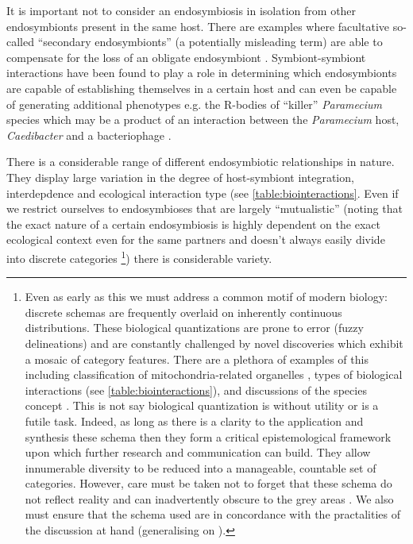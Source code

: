 It is important not to consider an endosymbiosis in isolation from other endosymbionts present in the same host.
There are examples where facultative so-called ``secondary endosymbionts'' (a potentially misleading term) 
are able to compensate for the loss of an obligate endosymbiont \citep{Koga2003}.  Symbiont-symbiont 
interactions have been found to play a role in determining which endosymbionts are capable of establishing themselves 
in a certain host and can even be capable of generating additional phenotypes e.g. the R-bodies of ``killer'' \textit{Paramecium} 
species which may be a product of an interaction between the \textit{Paramecium} host, \textit{Caedibacter} and a bacteriophage
\citep{Schrallhammer2009}.

There is a considerable range of different endosymbiotic relationships in nature. They display large variation in the 
degree of host-symbiont integration, interdepdence and ecological interaction type (see \ref{table:biointeractions}.  
Even if we restrict ourselves to endosymbioses that are largely ``mutualistic'' (noting that the exact nature of
a certain endosymbiosis is highly dependent on the exact ecological context even for the same partners and doesn't 
always easily divide into discrete categories \citep{Leung2008}\footnote{Even as early as this we 
    must address a common motif of modern biology: discrete schemas are frequently 
    overlaid on inherently continuous distributions.  These biological quantizations are prone to error (fuzzy delineations)
    and are constantly challenged by novel discoveries which exhibit a mosaic of category features.  
    There are a plethora of examples of this including classification of 
    mitochondria-related organelles \citep{Maguire2014}, types of biological interactions 
    (see \ref{table:biointeractions}), and discussions of the species concept \citep{DeQueiroz2007,Boenigk2012}.
    This is not say biological quantization is without utility or is a futile task.  Indeed, as long as there is a clarity to 
    the application and synthesis these schema then they form a critical epistemological framework upon which further 
    research and communication can build. They allow innumerable diversity to be reduced into a manageable, countable set of categories. 
    However, care must be taken not to forget that these schema do not reflect reality and can inadvertently obscure
    to the grey areas \citep{Leung2008}.  We also must ensure that the schema used are in concordance with the practalities of the 
discussion at hand (generalising on \citep{Boenigk2012}).}) there is considerable variety.

